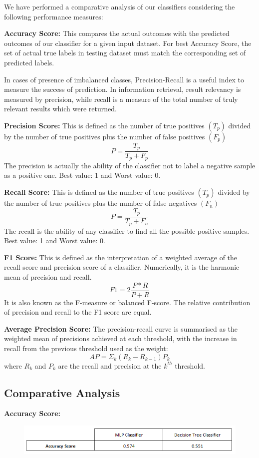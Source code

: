 \documentclass[a4paper, 10pt, conference]{IEEEtran}
\begin{document}
We have performed a comparative analysis of our classifiers considering the following performance measures: 

\textbf{Accuracy Score:}
 This compares the actual outcomes with the predicted outcomes of our classifier for a given input dataset. For best Accuracy Score, the set of actual true labels in testing dataset must match the corresponding set of predicted labels.

In cases of presence of imbalanced classes, Precision-Recall is a useful index to measure the success of prediction. In information retrieval, result relevancy is measured by precision, while recall is a measure of the total number of truly relevant results which were returned.

\textbf{Precision Score:}
This is defined as the number of true positives $(T_{p})$ divided by the number of true positives plus the number of false positives $(F_{p})$
\[ P = \frac{T_{p}}{T_{p}+F_{p}}\]
The precision is actually the ability of the classifier not to label a negative sample as a positive one. Best value: 1 and Worst value: 0. 

\textbf{Recall Score:}
This is defined as the number of true positives $(T_{p})$ divided by the number of true positives plus the number of false negatives $(F_{n})$
\[ P = \frac{T_{p}}{T_{p}+F_{n}}\]
The recall is the ability of any classifier to find all the possible positive samples. Best value: 1 and Worst value: 0.

\textbf{F1 Score:}
This is defined as the interpretation of a weighted average of the recall score and precision score of a classifier. Numerically, it is the harmonic mean of precision and recall.
\[ F1 = 2 \frac{P*R}{P+R}
\]
It is also known as the F-measure or balanced F-score. The relative contribution of precision and recall to the F1 score are equal.

\textbf{Average Precision Score:}
The precision-recall curve is summarised as the weighted mean of precisions achieved at each threshold, with the increase in recall from the previous threshold used as the weight:
\[ AP = \Sigma_{k}(R_{k}-R_{k-1})P_{k}\]
where \textit{$R_{k}$} and \textit{$P_{k}$} are the recall and precision at the \textit{$k^{th}$} threshold.

\subsection{Comparative Analysis}
\textbf{Accuracy Score:}
\begin{figure}[h!]
  \includegraphics[width=\linewidth]{ModelScore.png}
  \label{fig:scoremodel}
\end{figure}
\end{document}
